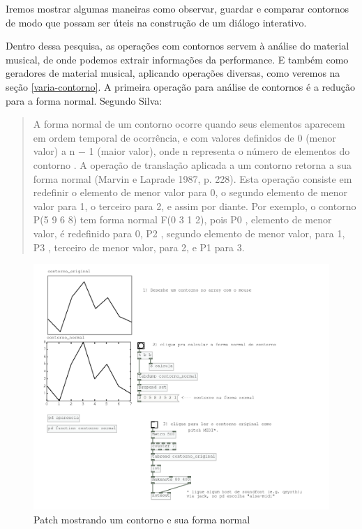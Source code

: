 \documentclass[draft]{ppgmus}
\begin{document}
Iremos mostrar algumas maneiras como observar, guardar e comparar contornos de modo
que possam ser úteis na construção de um diálogo interativo.

Dentro dessa pesquisa, as operações com contornos servem à análise do material musical,
de onde podemos extrair informações da performance. E também como geradores de material
musical, aplicando operações diversas, como veremos na seção \ref{varia-contorno}.
A primeira operação para análise de contornos é a redução para a forma normal. Segundo Silva:

\begin{quote}
 A forma normal de um contorno ocorre quando seus elementos aparecem em ordem
temporal de ocorrência, e com valores definidos de 0 (menor valor) a n − 1 (maior valor),
onde n  representa o número de elementos do contorno . A operação de translação aplicada a um
contorno retorna a sua forma normal (Marvin e Laprade 1987, p. 228). Esta operação
consiste em redefinir o elemento de menor valor para 0, o segundo elemento de menor
valor para 1, o terceiro para 2, e assim por diante. Por exemplo, o contorno P(5 9 6 8)
tem forma normal F(0 3 1 2), pois P0 , elemento de menor valor, é redefinido para 0, P2 ,
segundo elemento de menor valor, para 1, P3 , terceiro de menor valor, para 2, e P1 para
3.
\end{quote}


\begin{figure}
\includegraphics[scale=.2]{contorno-normal}
\caption{Patch mostrando um contorno e sua forma normal}
\label{contorno-normal}
\end{figure}
\end{document}
